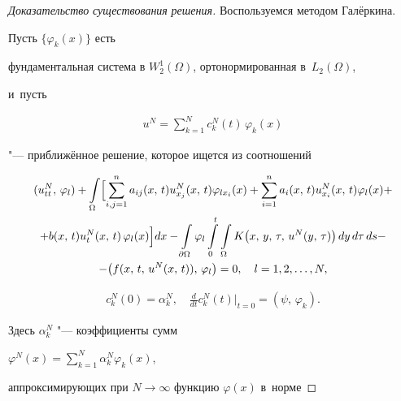 \begin{proof}[Доказательство\,\,существования\,\,решения]


Воспользуемся методом Галёркина.


Пусть $\{\varphi_k(x)\}$ есть


фундаментальная система в $W_2^1(\Omega)$, ортонормированная в~$L_2(\Omega)$,


и~пусть


\begin{eqnarray}


\label{dmitr:g18} u^N=\sum\limits_{k=1}^Nc_k^N(t)\,\varphi_k(x)


\end{eqnarray}


"--- приближённое решение, которое ищется из соотношений


\begin{multline}


 (u_{tt}^N,\, \varphi_l)+


\int\limits_{\Omega} \Bigl[\sum\limits_{i,j=1}^n


a_{ij}(x,\, t)u_{x_j}^N(x,\,t)\varphi_{lx_i}(x)


+\sum\limits_{i=1}^{n}a_i(x,\,t)u_{x_i}^N(x,\,t)\varphi_{l}(x)+


\\


+b(x,\,t)u_t^N(x,\,t)\,\varphi_{l}(x)\Bigr] dx


-\int\limits_{\partial\Omega}\varphi_l \int\limits_0^t


\int\limits_{\Omega}K\bigl(x,\,y,\,\tau,\,u^N(y,\,\tau)\bigr)\,dy\,d\tau\,ds-


\\


\label{dmitr:g19}


-\bigl(f(x,\,t,\,u^N(x,\,t)),\,\varphi_l\bigr)=0,\quad l=1,2,\ldots,N,


\end{multline}


\begin{eqnarray}


\label{dmitr:g20} c_k^N(0)=\alpha_k^N,\quad \frac d{dt}c_k^N(t)\Big|_{t=0}=(\psi,\,\varphi_k).


\end{eqnarray}


Здесь $\alpha_k^N$ "--- коэффициенты сумм


$\varphi^N(x)=\sum\limits_{k=1}^N\alpha_k^N\varphi_k(x)$,


аппроксимирующих при $N\to\infty$ функцию $\varphi(x)$ в~норме



\end{proof}
